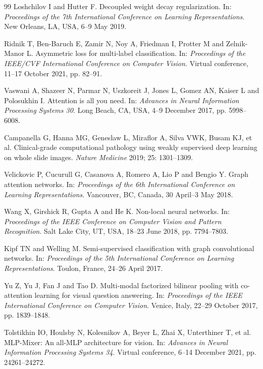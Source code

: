 \documentclass[Afour,sagev,times]{sagej}
\begin{document}
\begin{thebibliography}{99}
Loshchilov I and Hutter F. Decoupled weight decay regularization. In: \textit{Proceedings of the 7th International Conference on Learning Representations}. New Orleans, LA, USA, 6--9 May 2019.

Ridnik T, Ben-Baruch E, Zamir N, Noy A, Friedman I, Protter M and Zelnik-Manor L. Asymmetric loss for multi-label classification. In: \textit{Proceedings of the IEEE/CVF International Conference on Computer Vision}. Virtual conference, 11--17 October 2021, pp. 82--91.

Vaswani A, Shazeer N, Parmar N, Uszkoreit J, Jones L, Gomez AN, Kaiser L and Polosukhin I. Attention is all you need. In: \textit{Advances in Neural Information Processing Systems 30}. Long Beach, CA, USA, 4--9 December 2017, pp. 5998--6008.

Campanella G, Hanna MG, Geneslaw L, Miraflor A, Silva VWK, Busam KJ, et al. Clinical-grade computational pathology using weakly supervised deep learning on whole slide images. \textit{Nature Medicine} 2019; 25: 1301--1309.

Velickovic P, Cucurull G, Casanova A, Romero A, Lio P and Bengio Y. Graph attention networks. In: \textit{Proceedings of the 6th International Conference on Learning Representations}. Vancouver, BC, Canada, 30 April--3 May 2018.

Wang X, Girshick R, Gupta A and He K. Non-local neural networks. In: \textit{Proceedings of the IEEE Conference on Computer Vision and Pattern Recognition}. Salt Lake City, UT, USA, 18--23 June 2018, pp. 7794--7803.

Kipf TN and Welling M. Semi-supervised classification with graph convolutional networks. In: \textit{Proceedings of the 5th International Conference on Learning Representations}. Toulon, France, 24--26 April 2017.

Yu Z, Yu J, Fan J and Tao D. Multi-modal factorized bilinear pooling with co-attention learning for visual question answering. In: \textit{Proceedings of the IEEE International Conference on Computer Vision}. Venice, Italy, 22--29 October 2017, pp. 1839--1848.

Tolstikhin IO, Houlsby N, Kolesnikov A, Beyer L, Zhai X, Unterthiner T, et al. MLP-Mixer: An all-MLP architecture for vision. In: \textit{Advances in Neural Information Processing Systems 34}. Virtual conference, 6--14 December 2021, pp. 24261--24272.

\end{thebibliography}
\end{document}
